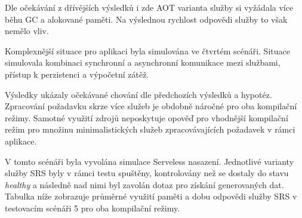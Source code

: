 
Dle očekávání z dřívějších výsledků i zde AOT varianta služby si vyžádala více běhu GC a alokované paměti. Na výslednou rychlost odpovědi služby to však nemělo vliv.


Komplexnější situace pro aplikaci byla simulována ve čtvrtém scénáři. Situace simulovala kombinaci synchronní a asynchronní komunikace mezi službami, přístup k perzistenci a výpočetní zátěž. 


Výsledky ukázaly očekávané chování dle předchozích výsledků a hypotéz. Zpracování požadavku skrze více služeb je obdobně náročné pro oba kompilační režimy. Samotné využití zdrojů neposkytuje opověď pro vhodnější kompilační režim pro množinu minimalistických služeb zpracovávajících požadavek v rámci aplikace.


V tomto scénáři byla vyvolána simulace Serveless nasazení. Jednotlivé varianty služby SRS byly v rámci testu spuštěny, kontrolovány než se dostaly do stavu \emph{healthy} a následně nad nimi byl zavolán dotaz pro získání generovaných dat. Tabulka níže zobrazuje průměrné využití paměti a dobu odpovědi služby SRS v testovacím scénáři 5 pro oba kompilační režimy. 


